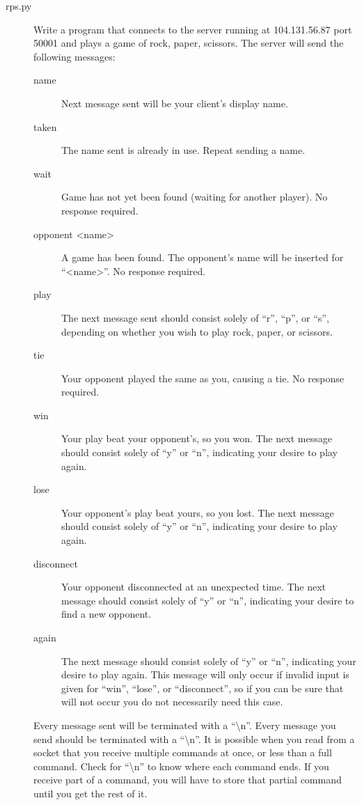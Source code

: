 \documentclass[11pt]{cselabheader}
\begin{document}
\begin{description}
\item[rps.py] Write a program that connects to the server running at
  104.131.56.87 port 50001 and plays a game of rock, paper, scissors. The server
  will send the following messages:

  \begin{description}
    \item[name] Next message sent will be your client's display name.
    \item[taken] The name sent is already in use. Repeat sending a name.
    \item[wait] Game has not yet been found (waiting for another player). No
      response required.
    \item[opponent <name>] A game has been found. The opponent's name will be
      inserted for ``<name>''. No response required.
    \item[play] The next message sent should consist solely of ``r'', ``p'', or
      ``s'', depending on whether you wish to play rock, paper, or scissors.
    \item[tie] Your opponent played the same as you, causing a tie. No response
      required.
    \item[win] Your play beat your opponent's, so you won. The next
      message should consist solely of ``y'' or ``n'', indicating your desire to
      play again.
    \item[lose] Your opponent's play beat yours, so you lost. The next message
      should consist solely of ``y'' or ``n'', indicating your desire to play
      again.  
    \item[disconnect] Your opponent disconnected at an unexpected time.  The
      next message should consist solely of ``y'' or ``n'', indicating your
      desire to find a new opponent.
    \item[again] The next message should consist solely of ``y'' or ``n'',
      indicating your desire to play again. This message will only occur if
      invalid input is given for ``win'', ``lose'', or ``disconnect'', so if
      you can be sure that will not occur you do not necessarily need this
      case.
  \end{description}

  Every message sent will be terminated with a ``\textbackslash{}n''. Every message you send
  should be terminated with a ``\textbackslash{}n''. It is possible when you read from a socket
  that you receive multiple commands at once, or less than a full command. Check
  for ``\textbackslash{}n'' to know where each command ends. If you receive part of a command, you
  will have to store that partial command until you get the rest of it.


\end{description}
\end{document}
